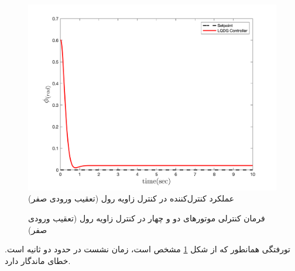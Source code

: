 \begin{figure}[H]
	\includegraphics[width=.48\linewidth]{../Figures/MIL/LQDG/Roll/lqdg_roll_nn.png}
	\centering
	\caption{عملكرد کنترل‌کننده  در کنترل زاويه رول (تعقیب ورودی صفر)}
	\label{lqdg_roll_fig_simulation}
\end{figure}
\begin{figure}[H]
	\centering
	\caption{‫‪فرمان کنترلی موتورهای دو و چهار در کنترل زاویه رول (تعقیب ورودی صفر)}
\end{figure}

‌تورفتگی همانطور که از شکل
\ref{lqdg_roll_fig_simulation}
مشخص است، زمان نشست در حدود دو ثانیه است. خطای ماندگار دارد.